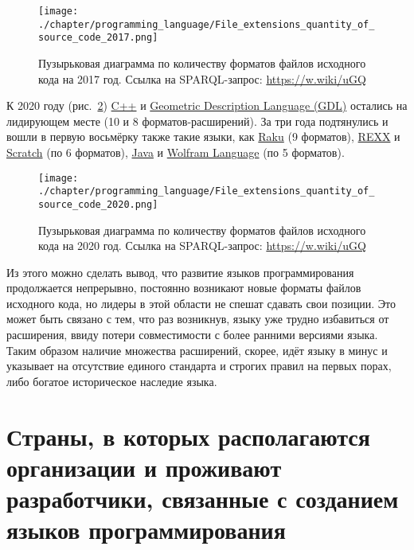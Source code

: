 \begin{figure}
\centering
	\texttt{[image: ./chapter/programming\_language/File\_extensions\_quantity\_of\_source\_code\_2017.png]}
	\label{fig:source_format_2017}
	\caption{Пузырьковая диаграмма по количеству форматов файлов исходного кода на 2017 год. Ссылка на SPARQL-запрос: \href{https://w.wiki/uGQ}{https://w.wiki/uGQ}}
\end{figure}
К 2020 году (рис.~\ref{fig:source_format_2020}) \href{https://en.wikipedia.org/wiki/C++}{C++} и \href{https://en.wikipedia.org/wiki/Geometric_Description_Language}{Geometric Description Language (GDL)} остались на лидирующем месте (10 и 8 форматов-расширений). За три года подтянулись и вошли в первую восьмёрку также такие языки, как \href{https://en.wikipedia.org/wiki/Raku_(programming_language)}{Raku} (9 форматов), \href{https://en.wikipedia.org/wiki/Rexx}{REXX} и \href{https://en.wikipedia.org/wiki/Scratch_(programming_language)}{Scratch} (по 6 форматов), \href{https://ru.wikipedia.org/wiki/Java}{Java} и \href{https://en.wikipedia.org/wiki/Wolfram_Language}{Wolfram Language} (по 5 форматов).
\begin{figure}
\centering
	\texttt{[image: ./chapter/programming\_language/File\_extensions\_quantity\_of\_source\_code\_2020.png]}
	\label{fig:source_format_2020}
	\caption{Пузырьковая диаграмма по количеству форматов файлов исходного кода на 2020 год. Ссылка на SPARQL-запрос: \href{https://w.wiki/uGQ}{https://w.wiki/uGQ}}
\end{figure}

Из этого можно сделать вывод, что развитие языков программирования продолжается непрерывно, постоянно возникают новые форматы файлов исходного кода, но лидеры в этой области не спешат сдавать свои позиции. Это может быть связано с тем, что раз возникнув, языку уже трудно избавиться от расширения, ввиду потери совместимости с более ранними версиями языка. Таким образом наличие множества расширений, скорее, идёт языку в минус и указывает на отсутствие единого стандарта и строгих правил на первых порах, либо богатое историческое наследие языка.

\section{Страны, в которых располагаются организации и проживают разработчики, связанные с созданием языков программирования}


